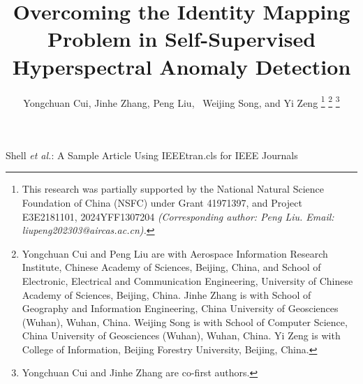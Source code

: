\documentclass[journal]{IEEEtran}
\begin{document}


\title{Overcoming the Identity Mapping Problem in Self-Supervised Hyperspectral Anomaly Detection}

\author{Yongchuan Cui, 
        Jinhe Zhang,
        Peng Liu,~
        Weijing Song, 
        and Yi Zeng
\thanks{This research was partially supported by the National Natural Science Foundation of China (NSFC) under Grant 41971397, and Project E3E2181101, 2024YFF1307204 \textit{(Corresponding author: Peng Liu. Email: \mbox{liupeng202303@aircas.ac.cn}).}}
\thanks{Yongchuan Cui and Peng Liu are with Aerospace Information Research Institute, Chinese Academy of Sciences, Beijing, China, and School of Electronic, Electrical and Communication Engineering, University of Chinese Academy of Sciences, Beijing, China. Jinhe Zhang is with School of Geography and Information Engineering, China University of Geosciences (Wuhan), Wuhan, China. Weijing Song is with School of Computer Science, China University of Geosciences (Wuhan), Wuhan, China. Yi Zeng is with College of Information, Beijing Forestry University, Beijing, China.}
\thanks{Yongchuan Cui and Jinhe Zhang are co-first authors.}
}

%
{Shell \MakeLowercase{\textit{et al.}}: A Sample Article Using IEEEtran.cls for IEEE Journals}



\maketitle












% 
\end{document}
